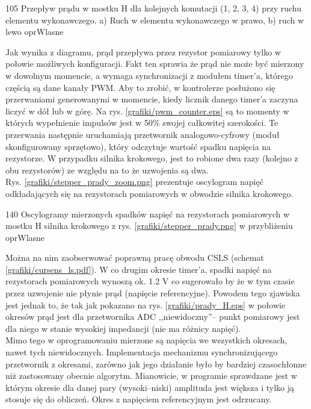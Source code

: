 	{105}
	{Przepływ prądu w mostku H dla kolejnych komutacji (1, 2, 3, 4) przy ruchu elementu wykonawczego. a) Ruch w elementu wykonawczego w prawo, b) ruch w lewo}
	{oprWlasne}

Jak wynika z diagramu, prąd przepływa przez rezystor pomiarowy tylko w połowie możliwych konfiguracji. Fakt ten sprawia że prąd nie może być mierzony w dowolnym momencie, a wymaga synchronizacji z modułem timer'a, którego częścią są dane kanały PWM. Aby to zrobić, w kontrolerze posłużono się przerwaniami generowanymi w momencie, kiedy licznik danego timer'a zaczyna liczyć w dół lub w górę. Na rys. \ref{grafiki/pwm_counter.eps} są to momenty w których wypełnienie impulsów jest w 50\% swojej całkowitej szerokości. Te przerwania następnie uruchamiają przetwornik analogowo-cyfrowy (moduł skonfigurowany sprzętowo), który odczytuje wartość spadku napięcia na rezystorze. W przypadku silnika krokowego, jest to robione dwa razy (kolejno z obu rezystorów) ze względu na to że uzwojenia są dwa. \\

Rys. \ref{grafiki/stepper_prady_zoom.png} prezentuje oscylogram napięć odkładających się na rezystorach pomiarowych w obwodzie silnika krokowego. 

	{140}
	{Oscylogramy mierzonych spadków napięć na rezystorach pomiarowych w mostku H silnika krokowego z rys. \ref{grafiki/stepper_prady.png} w przybliżeniu}
	{oprWlasne}
	
Można na nim zaobserwować poprawną pracę obwodu CSLS (schemat \ref{grafiki/cursens_ls.pdf}). W co drugim okresie timer'a, spadki napięć na rezystorach pomiarowych wynoszą ok. 1.2 V co sugerowało by że w tym czasie przez uzwojenie nie płynie prąd (napięcie referencyjne). Powodem tego zjawiska jest jednak to, że tak jak pokazano na rys. \ref{grafiki/prady_H.eps} w połowie okresów prąd jest dla przetwornika ADC ,,niewidoczny''-- punkt pomiarowy jest dla niego w stanie wysokiej impedancji (nie ma różnicy napięć). \\

Mimo tego w oprogramowaniu mierzone są napięcia we wszystkich okresach, nawet tych niewidocznych. Implementacja mechanizmu synchronizującego przetwornik z okresami, zarówno jak jego działanie było by bardziej czasochłonne niż zastosowany obecnie algorytm. Mianowicie, w programie sprawdzane jest w którym okresie dla danej pary (wysoki--niski) amplituda jest większa i tylko ją stosuje się do obliczeń. Okres z napięciem referencyjnym jest odrzucany. \\

